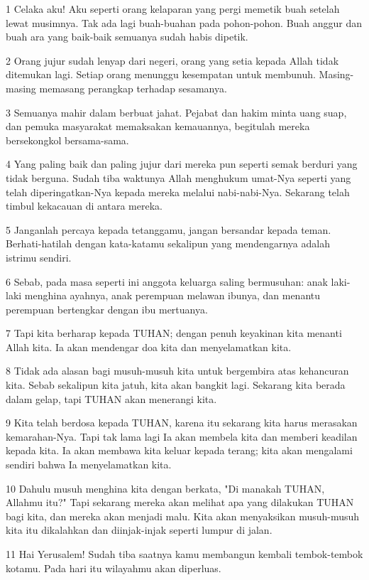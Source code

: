 \par 1 Celaka aku! Aku seperti orang kelaparan yang pergi memetik buah setelah lewat musimnya. Tak ada lagi buah-buahan pada pohon-pohon. Buah anggur dan buah ara yang baik-baik semuanya sudah habis dipetik.
\par 2 Orang jujur sudah lenyap dari negeri, orang yang setia kepada Allah tidak ditemukan lagi. Setiap orang menunggu kesempatan untuk membunuh. Masing-masing memasang perangkap terhadap sesamanya.
\par 3 Semuanya mahir dalam berbuat jahat. Pejabat dan hakim minta uang suap, dan pemuka masyarakat memaksakan kemauannya, begitulah mereka bersekongkol bersama-sama.
\par 4 Yang paling baik dan paling jujur dari mereka pun seperti semak berduri yang tidak berguna. Sudah tiba waktunya Allah menghukum umat-Nya seperti yang telah diperingatkan-Nya kepada mereka melalui nabi-nabi-Nya. Sekarang telah timbul kekacauan di antara mereka.
\par 5 Janganlah percaya kepada tetanggamu, jangan bersandar kepada teman. Berhati-hatilah dengan kata-katamu sekalipun yang mendengarnya adalah istrimu sendiri.
\par 6 Sebab, pada masa seperti ini anggota keluarga saling bermusuhan: anak laki-laki menghina ayahnya, anak perempuan melawan ibunya, dan menantu perempuan bertengkar dengan ibu mertuanya.
\par 7 Tapi kita berharap kepada TUHAN; dengan penuh keyakinan kita menanti Allah kita. Ia akan mendengar doa kita dan menyelamatkan kita.
\par 8 Tidak ada alasan bagi musuh-musuh kita untuk bergembira atas kehancuran kita. Sebab sekalipun kita jatuh, kita akan bangkit lagi. Sekarang kita berada dalam gelap, tapi TUHAN akan menerangi kita.
\par 9 Kita telah berdosa kepada TUHAN, karena itu sekarang kita harus merasakan kemarahan-Nya. Tapi tak lama lagi Ia akan membela kita dan memberi keadilan kepada kita. Ia akan membawa kita keluar kepada terang; kita akan mengalami sendiri bahwa Ia menyelamatkan kita.
\par 10 Dahulu musuh menghina kita dengan berkata, "Di manakah TUHAN, Allahmu itu?" Tapi sekarang mereka akan melihat apa yang dilakukan TUHAN bagi kita, dan mereka akan menjadi malu. Kita akan menyaksikan musuh-musuh kita itu dikalahkan dan diinjak-injak seperti lumpur di jalan.
\par 11 Hai Yerusalem! Sudah tiba saatnya kamu membangun kembali tembok-tembok kotamu. Pada hari itu wilayahmu akan diperluas.
